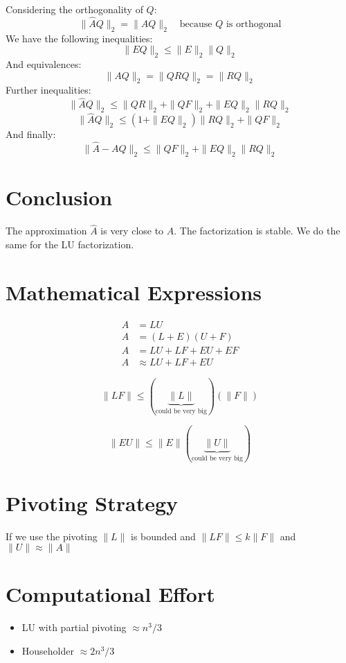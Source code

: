 Considering the orthogonality of $Q$:
\[
\|\hat{A}Q\|_2 = \|AQ\|_2 \quad \text{because $Q$ is orthogonal}
\]
We have the following inequalities:
\[
\|EQ\|_2 \leq \|E\|_2\|Q\|_2
\]
And equivalences:
\[
\|AQ\|_2 = \|QRQ\|_2 = \|RQ\|_2
\]
Further inequalities:
\[
\|\hat{A}Q\|_2 \leq \|QR\|_2 + \|QF\|_2 + \|EQ\|_2\|RQ\|_2
\]
\[
\|\hat{A}Q\|_2 \leq (1 + \|EQ\|_2)\|RQ\|_2 + \|QF\|_2
\]
And finally:
\[
\|\hat{A} - AQ\|_2 \leq \|QF\|_2 + \|EQ\|_2\|RQ\|_2
\]

\section*{Conclusion}

The approximation $\hat{A}$ is very close to $A$. The factorization is stable. We do the same for the LU factorization.

\section*{Mathematical Expressions}

\begin{align*}
A &= LU \\
A &= (L + E)(U + F) \\
A &= LU + LF + EU + EF \\
A &\approx LU + LF + EU
\end{align*}

\begin{mdframed}[backgroundcolor=blue!20]
\[\|LF\| \leq (\underbrace{\|L\|}_{\text{could be very big}}) (\|F\|)\]
\end{mdframed}

\begin{mdframed}[backgroundcolor=blue!20]
\[\|EU\| \leq \|E\|(\underbrace{\|U\|}_{\text{could be very big}})\]
\end{mdframed}

\section*{Pivoting Strategy}

If we use the pivoting $\|L\|$ is bounded and $\|LF\| \leq k\|F\|$ and $\|U\| \approx \|A\|$

\section*{Computational Effort}

\begin{itemize}
\item LU with partial pivoting $\approx n^3/3$
\item Householder $\approx 2n^3/3$
\end{itemize}

